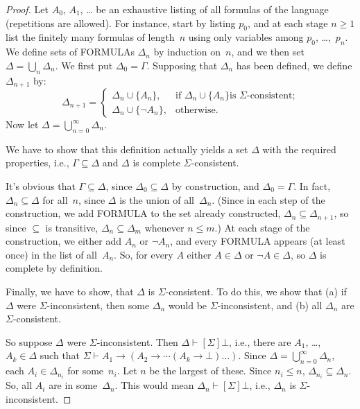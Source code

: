 \documentclass[10pt,a4paper]{article}
\newcommand*{\olup}[1]{\MakeUppercase{#1}}
\theoremstyle{plain}
\theoremstyle{definition}
\theoremstyle{remark}
\providecommand{\lif}{\mathbin{\rightarrow}}
\providecommand{\lfalse}{\bot}
\providecommand{\Proves}{\mathrel{\vdash}}
\providecommand{\Obj}{}
\begin{document}
\begin{proof}
Let $A_0$, $A_1$, \dots{} be an exhaustive listing of all formulas
of the language (repetitions are allowed). For instance, start by
listing $\Obj p_0$, and at each stage $n \ge 1$ list the finitely many
formulas of length~$n$ using only variables among $\Obj p_0$,
\dots,~$\Obj p_n$. We define sets of \olup{formula}s $\Delta_n$ by
induction on~$n$, and we then set $\Delta = \bigcup_n \Delta_n$. We
first put $\Delta_0 = \Gamma$. Supposing that $\Delta_n$ has been
defined, we define $\Delta_{n+1}$ by:
\[
\Delta_{n+1} =
\begin{cases}
  \Delta_n \cup \{A_n\}, & \text{if $\Delta_n \cup \{ A_n\}$
    is $\Sigma$-consistent;} \\
  \Delta_n \cup \{ \lnot A_n\}, & \text{otherwise.}
\end{cases}
\]
Now let $\Delta = \bigcup_{n=0}^\infty \Delta_n$.

We have to show that this definition actually yields a set $\Delta$
with the required properties, i.e., $\Gamma \subseteq \Delta$ and
$\Delta$ is complete $\Sigma$-consistent.

It's obvious that $\Gamma \subseteq \Delta$, since $\Delta_0 \subseteq
\Delta$ by construction, and $\Delta_0 = \Gamma$. In fact, $\Delta_n
\subseteq \Delta$ for all~$n$, since $\Delta$ is the union of
all~$\Delta_n$. (Since in each step of the construction, we add
\olup{formula} to the set already constructed, $\Delta_n \subseteq
\Delta_{n+1}$, so since $\subseteq$ is transitive, $\Delta_n \subseteq
\Delta_{m}$ whenever $n \le m$.)  At each stage of the construction, we
either add $A_n$ or $\lnot A_n$, and every \olup{formula} appears (at
least once) in the list of all~$A_n$. So, for every $A$ either $A
\in \Delta$ or $\lnot A \in \Delta$, so $\Delta$ is complete by
definition.

Finally, we have to show, that $\Delta$ is $\Sigma$-consistent.  To do
this, we show that (a) if $\Delta$ were $\Sigma$-inconsistent, then
some $\Delta_n$ would be $\Sigma$-inconsistent, and (b) all $\Delta_n$
are $\Sigma$-consistent.

So suppose $\Delta$ were $\Sigma$-inconsistent. Then $\Delta
\Proves[\Sigma] \lfalse$, i.e., there are $A_1$, \dots,~$A_k \in
\Delta$ such that $\Sigma \Proves A_1 \lif (A_2 \lif \cdots (A_k
\lif \lfalse)\dots)$. Since $\Delta = \bigcup_{n=0}^\infty \Delta_n$, each
$A_i \in \Delta_{n_i}$ for some~$n_i$. Let $n$ be the largest of
these. Since $n_i \le n$, $\Delta_{n_i} \subseteq \Delta_n$. So, all
$A_i$ are in some~$\Delta_n$. This would mean $\Delta_n
\Proves[\Sigma] \lfalse$, i.e., $\Delta_n$ is $\Sigma$-inconsistent.


\end{proof}
\end{document}
